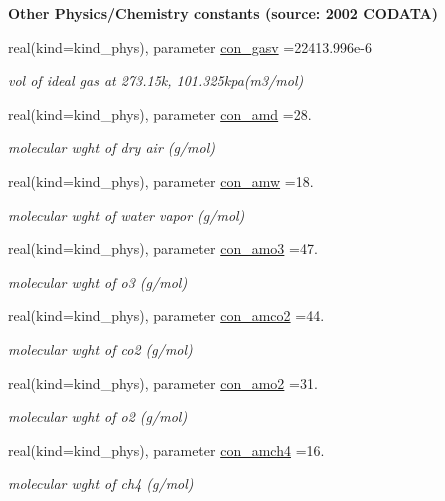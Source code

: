 \begin{Indent}{\bf Other Physics/\+Chemistry constants (source\+: 2002 C\+O\+D\+A\+TA)}
\begin{DoxyCompactItemize}
real(kind=kind\+\_\+phys), parameter \hyperlink{namespacephyscons_a154e74ee27785d0568c18955cb21f6ac}{con\+\_\+gasv} =22413.\+996e-\/6
\begin{DoxyCompactList}\small\item\em vol of ideal gas at 273.\+15k, 101.\+325kpa(m3/mol) \end{DoxyCompactList}\item 
real(kind=kind\+\_\+phys), parameter \hyperlink{namespacephyscons_acb2960ad74b80b31da0bff4be5c2add3}{con\+\_\+amd} =28.
\begin{DoxyCompactList}\small\item\em molecular wght of dry air (g/mol) \end{DoxyCompactList}\item 
real(kind=kind\+\_\+phys), parameter \hyperlink{namespacephyscons_afcf5656ae531bc0a656bd079bfe157c3}{con\+\_\+amw} =18.
\begin{DoxyCompactList}\small\item\em molecular wght of water vapor (g/mol) \end{DoxyCompactList}\item 
real(kind=kind\+\_\+phys), parameter \hyperlink{namespacephyscons_aa2a3f6c3591ab317abdc629b20c3f87f}{con\+\_\+amo3} =47.
\begin{DoxyCompactList}\small\item\em molecular wght of o3 (g/mol) \end{DoxyCompactList}\item 
real(kind=kind\+\_\+phys), parameter \hyperlink{namespacephyscons_a1e3ed46b6ce3d1a82db6a192c840091f}{con\+\_\+amco2} =44.
\begin{DoxyCompactList}\small\item\em molecular wght of co2 (g/mol) \end{DoxyCompactList}\item 
real(kind=kind\+\_\+phys), parameter \hyperlink{namespacephyscons_adffb549f49f2a2160ad3187ef75f60d5}{con\+\_\+amo2} =31.
\begin{DoxyCompactList}\small\item\em molecular wght of o2 (g/mol) \end{DoxyCompactList}\item 
real(kind=kind\+\_\+phys), parameter \hyperlink{namespacephyscons_af16eb677db27151bc06db14eefd6c07d}{con\+\_\+amch4} =16.
\begin{DoxyCompactList}\small\item\em molecular wght of ch4 (g/mol) \end{DoxyCompactList}\item 

\end{DoxyCompactItemize}
\end{Indent}
